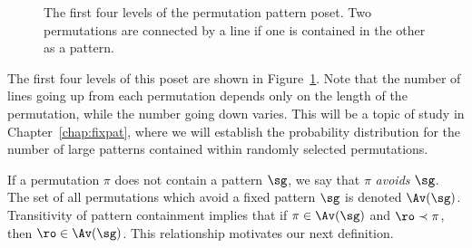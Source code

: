 \documentclass[12pt,twoside]{memoir}
\begin{document}
\begin{figure}[t]
{
          }
      \caption[The first four levels of the permutation pattern poset.]{
            The first four levels of the permutation pattern poset. Two
            permutations are connected by a line if one is contained in the other
            as a pattern.}
      \label{prelim:fig:poset}
      \end{figure}

      The first four levels of this poset are shown in
      Figure~\ref{prelim:fig:poset}. Note that the number of lines going up from
      each permutation depends only on the length of the permutation, while the
      number going down varies. This will be a topic of study in
      Chapter~\ref{chap:fixpat}, where we will establish the probability
      distribution for the number of large patterns contained within randomly
      selected permutations. 

      If a permutation $\pi$ does not contain a pattern $\sg$, we say that $\pi$
      \emph{avoids} $\sg$. The set of all permutations which avoid a fixed
      pattern $\sg$ is denoted $\Av(\sg)$. Transitivity of pattern containment
      implies that if $\pi \in \Av(\sg)$ and $\ro \prec \pi$, then $\ro \in
      \Av(\sg)$. This relationship motivates our next definition. 
\end{document}
